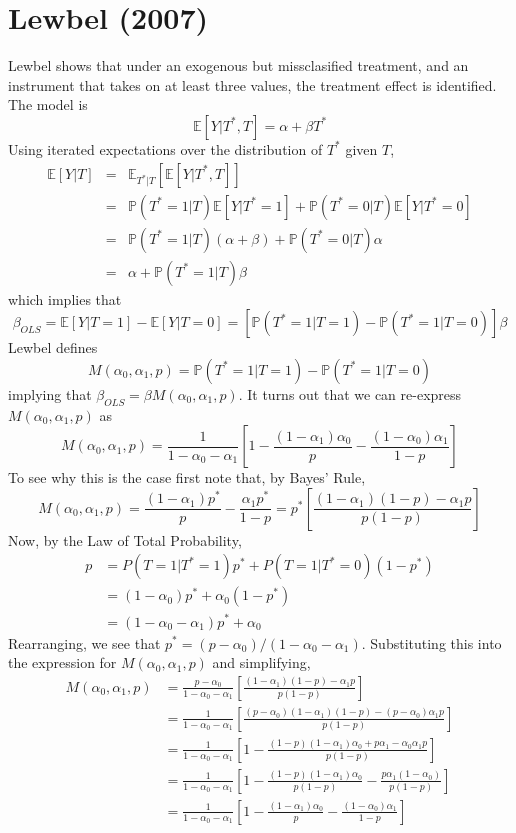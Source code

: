 \section{Lewbel (2007)}

Lewbel shows that under an exogenous but missclasified treatment,
and an instrument that takes on at least three values, the treatment
effect is identified. 
The model is 
\[
\mathbb{E}[Y|T^{*},T]=\alpha+\beta T^{*}
\]
Using iterated expectations over the distribution of $T^{*}$ given
$T$, 
\begin{eqnarray*}
\mathbb{E}[Y|T]&=& \mathbb{E}_{T^{*}|T}\left[\mathbb{E}[Y|T^{*},T]\right]\\
&=& \mathbb{P}(T^{*}=1|T)\mathbb{E}[Y|T^{*}=1]+\mathbb{P}(T^{*}=0|T)\mathbb{E}[Y|T^{*}=0]\\
&=& \mathbb{P}(T^{*}=1|T)(\alpha+\beta)+\mathbb{P}(T^{*}=0|T)\alpha\\
&=& \alpha+\mathbb{P}(T^{*}=1|T)\beta
\end{eqnarray*}
which implies that 
\[
\beta_{OLS}= \mathbb{E}[Y|T=1]-\mathbb{E}[Y|T=0]=\left[\mathbb{P}(T^{*}=1|T=1)-\mathbb{P}(T^{*}=1|T=0)\right]\beta
\]
Lewbel defines 
$$M(\alpha_{0},\alpha_{1},p)=\mathbb{P}(T^{*}=1|T=1)-\mathbb{P}(T^{*}=1|T=0)$$
implying that $\beta_{OLS} =\beta M(\alpha_{0},\alpha_{1},p)$.
It turns out that we can re-express $M(\alpha_0, \alpha_1,p)$ as
\[
M(\alpha_{0},\alpha_{1},p)=\frac{1}{1-\alpha_{0}-\alpha_{1}}\left[1-\frac{(1-\alpha_{1})\alpha_{0}}{p}-\frac{(1-\alpha_{0})\alpha_{1}}{1-p}\right]
\]
To see why this is the case first note that, by Bayes' Rule,
\begin{equation*}
M(\alpha_{0},\alpha_{1},p) = \frac{(1-\alpha_{1})p^{*}}{p}-\frac{\alpha_{1}p^{*}}{1-p}
=p^{*}\left[\frac{(1-\alpha_{1})(1-p)-\alpha_{1}p}{p(1-p)}\right]
\end{equation*}
Now, by the Law of Total Probability,
\begin{align*}
  p &= P(T=1|T^*=1)p^* + P(T=1|T^*=0)(1-p^*)\\
  &= (1 - \alpha_0)p^* + \alpha_0 (1-p^*)\\
  &= (1 - \alpha_0 - \alpha_1)p^* + \alpha_0
\end{align*}
Rearranging, we see that $p^* = (p - \alpha_0)/(1 - \alpha_0 - \alpha_1)$.
Substituting this into the expression for $M(\alpha_0, \alpha_1, p)$ and simplifying,
\begin{align*}
  M(\alpha_{0},\alpha_{1},p) &=\frac{p-\alpha_{0}}{1-\alpha_{0}-\alpha_{1}}\left[\frac{(1-\alpha_{1})(1-p)-\alpha_{1}p}{p(1-p)}\right]\\
&=\frac{1}{1-\alpha_{0}-\alpha_{1}}\left[\frac{(p-\alpha_{0})(1-\alpha_{1})(1-p)-(p-\alpha_{0})\alpha_{1}p}{p(1-p)}\right]\\
&=\frac{1}{1-\alpha_{0}-\alpha_{1}}\left[1-\frac{(1-p)(1-\alpha_{1})\alpha_{0}+p\alpha_{1}-\alpha_{0}\alpha_{1}p}{p(1-p)}\right]\\
&=\frac{1}{1-\alpha_{0}-\alpha_{1}}\left[1-\frac{(1-p)(1-\alpha_{1})\alpha_{0}}{p(1-p)}-\frac{p\alpha_{1}(1-\alpha_{0})}{p(1-p)}\right]\\
&=\frac{1}{1-\alpha_{0}-\alpha_{1}}\left[1-\frac{(1-\alpha_{1})\alpha_{0}}{p}-\frac{(1-\alpha_{0})\alpha_{1}}{1-p}\right]
\end{align*}

